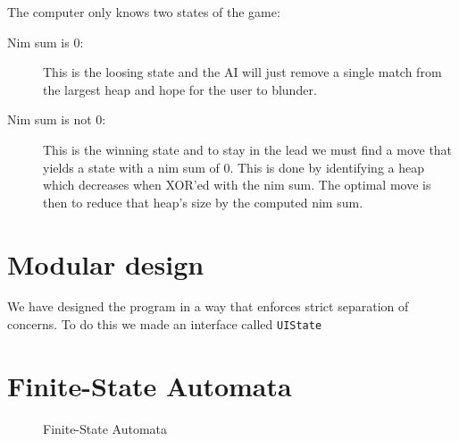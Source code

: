 \documentclass{article}
\begin{document}
The computer only knows two states of the game:
\begin{description}
\item[Nim sum is $0$:] This is the loosing state and the AI will just remove a single match from the largest heap and hope for the user to blunder.

\item[Nim sum is not $0$:] This is the winning state and to stay in the lead we must find a move that yields a state with a nim sum of $0$. This is done by identifying a heap which decreases when XOR'ed with the nim sum. The optimal move is then to reduce that heap's size by the computed nim sum.
\end{description}

\section{Modular design}
We have designed the program in a way that enforces strict separation of concerns. To do this we made an interface called \texttt{UIState}

\section{Finite-State Automata}
\begin{figure}[H]

\caption{Finite-State Automata}
\end{figure}
\end{document}
